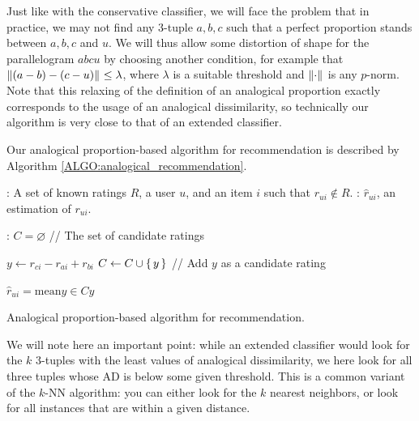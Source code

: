 Just like with the conservative classifier, we will face the problem that in
practice, we may not find any $3$-tuple $a, b, c$ such that a perfect
proportion stands between $a, b, c$ and $u$. We will thus allow some distortion
of shape for the parallelogram $abcu$ by choosing another condition, for
example that ${\left\lVert(a-b) - (c-u)\right\rVert}_{} \leq \lambda$, where $\lambda$ is a
suitable threshold and ${\left\lVert\cdot\right\rVert}_{}$ is any $p$-norm. Note that this
relaxing of the definition of an analogical proportion exactly corresponds to
the usage of an analogical dissimilarity, so technically our algorithm is very
close to that of an extended classifier.

Our analogical proportion-based algorithm for recommendation is described by
Algorithm \ref{ALGO:analogical_recommendation}.
 \begin{algorithm}[!ht]
       \begin{algorithmic}

      : A set of known ratings $R$, a user $u$, and an item
         $i$ such that $r_{ui} \notin R$.
      : $\hat{r}_{ui}$, an estimation of $r_{ui}$.

      :
      \STATE $C = \varnothing$ \quad \quad // The set of candidate ratings

      \STATE  $y \leftarrow r_{ci} - r_{ai} + r_{bi}$
      \STATE $C \gets C \cup \set{y}$ \quad // Add $y$ as a candidate rating
	  \ENDFOR

         \STATE $\hat{r}_{ui} = \text{mean}{y \in C} y$

\end{algorithmic}
     \caption{Analogical proportion-based algorithm for recommendation.}
       \label{ALGO:analogical_recommendation}
\end{algorithm}

We will note here an important point: while an extended classifier would look
for the $k$ $3$-tuples with the least values of analogical dissimilarity, we
here look for all three tuples whose AD is below some given threshold. This is
a common variant of the $k$-NN algorithm: you can either look for the $k$
nearest neighbors, or look for all instances that are within a given distance.

